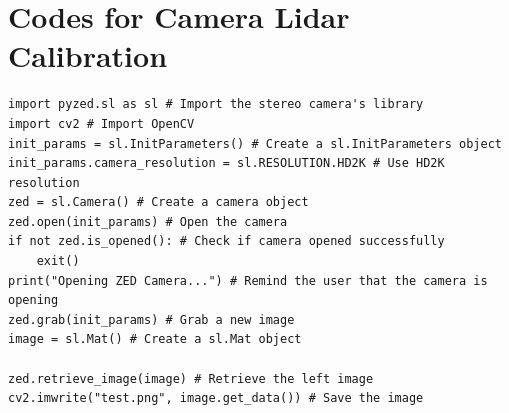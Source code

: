 \documentclass[balance,upint,subscriptcorrection,varvw,nofoot, mathalfa=cal=boondoxo,spanish,french,vietnamese,russian,greek,pdf-a,fontspec,colorlinks]{asmeconf}
\begin{document}

\nocite{*}%



\appendix


\newpage
\section[Camera Lidar Calibration]{Codes for Camera Lidar Calibration}\label{appendix:a}

\begin{verbatim} 
import pyzed.sl as sl # Import the stereo camera's library
import cv2 # Import OpenCV
init_params = sl.InitParameters() # Create a sl.InitParameters object
init_params.camera_resolution = sl.RESOLUTION.HD2K # Use HD2K resolution
zed = sl.Camera() # Create a camera object
zed.open(init_params) # Open the camera
if not zed.is_opened(): # Check if camera opened successfully
	exit()
print("Opening ZED Camera...") # Remind the user that the camera is opening
zed.grab(init_params) # Grab a new image
image = sl.Mat() # Create a sl.Mat object

zed.retrieve_image(image) # Retrieve the left image
cv2.imwrite("test.png", image.get_data()) # Save the image
\end{verbatim} 

\end{document}
